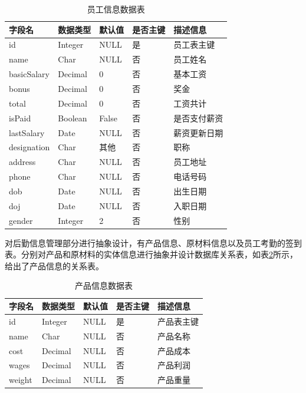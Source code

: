 \begin{table}[H]
    \centering
    \caption{员工信息数据表}
    \label{tab:emp}
    \begin{tabularx}{.95\textwidth}{X<{\centering}X<{\centering}X<{\centering}X<{\centering}X<{\centering}}
        \toprule
        字段名 & 数据类型 & 默认值 & 是否主键 & 描述信息 \\
        \midrule
        id & Integer & NULL & 是 & 员工表主键 \\
        name & Char & NULL & 否 & 员工姓名 \\
        basicSalary & Decimal & 0 & 否 & 基本工资 \\
        bonus & Decimal & 0 & 否 & 奖金 \\
        total & Decimal & 0 & 否 & 工资共计 \\
        isPaid & Boolean & False & 否 & 是否支付薪资 \\
        lastSalary & Date & NULL & 否 & 薪资更新日期 \\
        designation & Char & 其他 & 否 & 职称 \\
        address & Char & NULL & 否 & 员工地址 \\
        phone & Char & NULL & 否 & 电话号码 \\
        dob & Date & NULL & 否 & 出生日期 \\
        doj & Date & NULL & 否 & 入职日期 \\
        gender & Integer & 2 & 否 & 性别 \\
        \bottomrule
    \end{tabularx}
\end{table}

对后勤信息管理部分进行抽象设计，有产品信息、原材料信息以及员工考勤的签到表。分别对产品和原材料的实体信息进行抽象并设计数据库关系表，如表\ref{tab:product}所示，给出了产品信息的关系表。

\begin{table}[H]
    \centering
    \caption{产品信息数据表}
    \label{tab:product}
    \begin{tabularx}{.95\textwidth}{X<{\centering}X<{\centering}X<{\centering}X<{\centering}X<{\centering}}
        \toprule
        字段名 & 数据类型 & 默认值 & 是否主键 & 描述信息 \\
        \midrule
        id & Integer & NULL & 是 & 产品表主键 \\
        name & Char & NULL & 否 & 产品名称 \\
        cost & Decimal & NULL & 否 & 产品成本 \\
        wages & Decimal & NULL & 否 & 产品利润 \\
        weight & Decimal & NULL & 否 & 产品重量 \\
        \bottomrule
    \end{tabularx}
\end{table}

